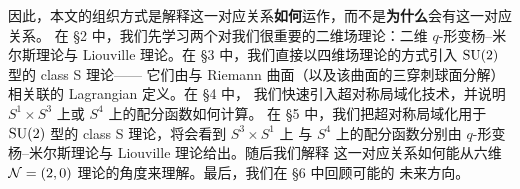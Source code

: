
因此，本文的组织方式是解释这一对应关系\textbf{如何}运作，而不是\textbf{为什么}会有这一对应关系。
在 §2 中，我们先学习两个对我们很重要的二维场理论：二维 $q$-形变杨--米尔斯理论与
Liouville 理论。在 §3 中，我们直接以四维场理论的方式引入 $\mathrm{SU}(2)$ 型的 class S 理论——
它们由与 Riemann 曲面（以及该曲面的三穿刺球面分解）相关联的 Lagrangian 定义。在 §4 中，
我们快速引入超对称局域化技术，并说明 $S^1\times S^3$ 上或 $S^4$ 上的配分函数如何计算。
在 §5 中，我们把超对称局域化用于 $\mathrm{SU}(2)$ 型的 class S 理论，将会看到 $S^3\times S^1$ 上
与 $S^4$ 上的配分函数分别由 $q$-形变杨--米尔斯理论与 Liouville 理论给出。随后我们解释
这一对应关系如何能从六维 $\mathcal{N}=(2,0)$ 理论的角度来理解。最后，我们在 §6 中回顾可能的
未来方向。

